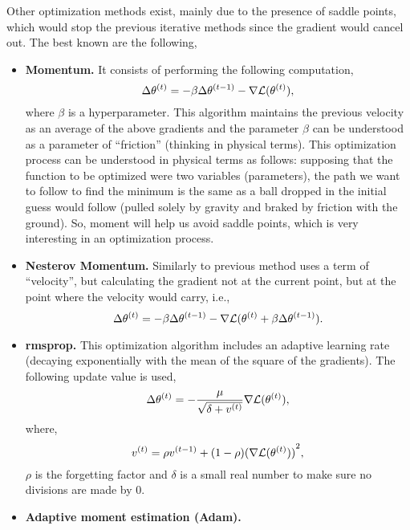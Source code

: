 Other optimization methods exist, mainly due to the presence of saddle points,
which would stop the previous iterative methods since the gradient would cancel
out. The best known are the following,
\begin{itemize}
  \item \textbf{Momentum.} It consists of performing the
  following computation,
  \begin{equation}
    \Delta\theta^{(t)} =
    -\beta\Delta\theta^{(t-1)} -\nabla\mathcal{L}(\theta^{(t)}),
  \end{equation}
  where \(\beta\) is a hyperparameter. This algorithm maintains the previous
  velocity as an average of the above gradients and the parameter \(\beta\) can
  be understood as a parameter of ``friction'' (thinking in physical
  terms). This optimization process can be understood in physical terms as
  follows: supposing that the function to be optimized were two variables
  (parameters), the path we want to follow to find the minimum is the same as a
  ball dropped in the initial guess would follow (pulled solely by gravity and
  braked by friction with the ground). So, moment will help us avoid saddle
  points, which is very interesting in an optimization process.
  \item \textbf{Nesterov Momentum.} Similarly to
  previous method uses a term of ``velocity'', but calculating the gradient not
  at the current point, but at the point where the velocity would carry, i.e.,
  \begin{equation}
    \Delta\theta^{(t)} =
    -\beta\Delta\theta^{(t-1)} -\nabla\mathcal{L}(\theta^{(t)} +
    \beta\Delta\theta^{(t-1)}).
  \end{equation}
  \item \textbf{\gls{rmsprop}.} This optimization
  algorithm includes an adaptive learning rate (decaying exponentially with the
  mean of the square of the gradients). The following update value is used,
  \begin{equation}
    \Delta\theta^{(t)} =
    -\frac{\mu}{\sqrt{\delta + v^{(t)}}}\nabla\mathcal{L}(\theta^{(t)}),
  \end{equation}
  where,
  \begin{equation}
    v^{(t)} = \rho v^{(t - 1)} + (1 - \rho){(\nabla\mathcal{L}(\theta^{(t)}))}^2,
  \end{equation}
  \(\rho\) is the forgetting factor and \(\delta\) is a small real number to
  make sure no divisions are made by \(0\).
  \item \textbf{Adaptive moment estimation (Adam).}

\end{itemize}
